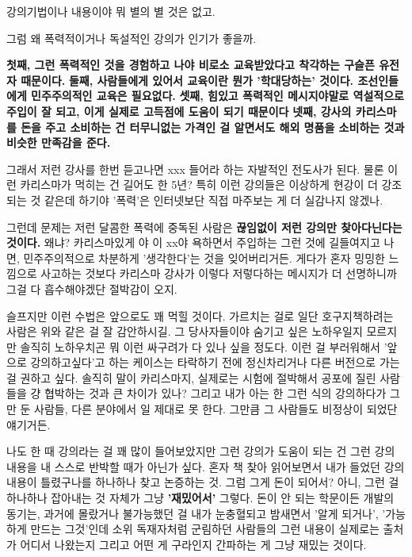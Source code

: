 강의기법이나 내용이야 뭐 별의 별 것은 없고.
\vspace{5mm}

그럼 왜 폭력적이거나 독설적인 강의가 인기가 좋을까.
\vspace{5mm}

\textbf{첫째, 그런 폭력적인 것을 경험하고 나야 비로소 교육받았다고 착각하는 구슬픈 유전자 때문이다.}
\textbf{둘째, 사람들에게 있어서 교육이란 뭔가 '학대당하는' 것이다. 조선인들에게 민주주의적인 교육은 필요없다.}
\textbf{셋째, 힘있고 폭력적인 메시지야말로 역설적으로 주입이 잘 되고, 이게 실제로 고득점에 도움이 되기 때문이다}
\textbf{넷째, 강사의 카리스마를 돈을 주고 소비하는 건 터무니없는 가격인 걸 알면서도 해외 명품을 소비하는 것과 비슷한 만족감을 준다.}
\vspace{5mm}

그래서 저런 강사를 한번 듣고나면 xxx 들어라 하는 자발적인 전도사가 된다.
물론 이런 카리스마가 먹히는 건 길어도 한 5년?
특히 이런 강의들은 이상하게 현강이 더 강조되는 것 같은데 하기야 '폭력'은 인터넷보단 직접 마주보는 게 더 실감나지 않겠나.
\vspace{5mm}

그런데 문제는 저런 달콤한 폭력에 중독된 사람은 \textbf{끊임없이 저런 강의만 찾아다닌다는 것이다.}
왜냐? 카리스마있게 야 이 xx야 욕하면서 주입하는 그런 것에 길들여지고 나면, 민주주의적으로 차분하게 '생각한다'는 것을 잊어버리거든.
게다가 혼자 밍밍한 느낌으로 사고하는 것보다 카리스마 강사가 이렇다 저렇다하는 메시지가 더 선명하니까 그걸 다 흡수해야겠단 절박감이 오지.
\vspace{5mm}

슬프지만 이런 수법은 앞으로도 꽤 먹힐 것이다. 가르치는 걸로 일단 호구지책하려는 사람은 위와 같은 걸 잘 감안하시길.
그 당사자들이야 숨기고 싶은 노하우일지 모르지만 솔직히 노하우치곤 뭐 이런 싸구려가 다 있나 싶을 정도다.
이런 걸 부러워해서 '앞으로 강의하고싶다'고 하는 케이스는 타락하기 전에 정신차리거나 다른 버전으로 가는 걸 권하고 싶다.
솔직히 말이 카리스마지, 실제로는 시험에 절박해서 공포에 질린 사람들을 걍 협박하는 것과 큰 차이가 있나?
그리고 내가 아는 한 그런 식의 강의하다가 그만 둔 사람들, 다른 분야에서 일 제대로 못 한다. 그만큼 그 사람들도 비정상이 되었단 얘기거든.
\vspace{5mm}

나도 한 때 강의라는 걸 꽤 많이 들어보았지만 그런 강의가 도움이 되는 건
그런 강의 내용을 내 스스로 반박할 때가 아닌가 싶다.
혼자 책 찾아 읽어보면서 내가 들었던 강의 내용이 틀렸구나를 하나하나 찾고 논증하는 것.
그럼 그게 돈이 되어서? 아니, 그런 걸 하나하나 잡아내는 것 자체가 그냥 \textbf{'재밌어서'} 그렇다.
돈이 안 되는 학문이든 개발의 동기는, 과거에 몰랐거나 불가능했던 걸 내가 눈충혈되고 밤새면서 '알게 되거나', '가능하게 만드는 그것'인데
소위 독재자처럼 군림하던 사람들의 그런 내용이 실제로는 출처가 어디서 나왔는지 그리고 어떤 게 구라인지 간파하는 게 그냥 재밌는 것이다.
\vspace{5mm}









